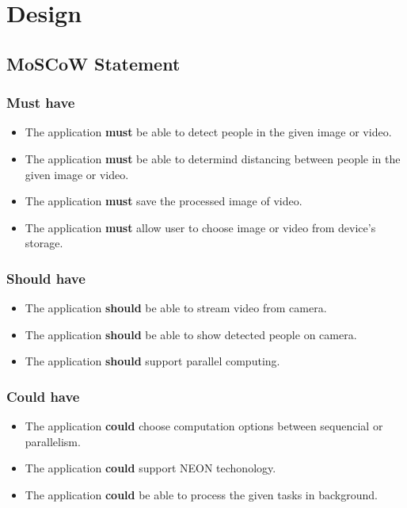 \chapter{Design}\label{design}

\section{MoSCoW Statement}


    \subsection{Must have}
        \begin{itemize}
            \setlength\itemsep{1em}
            \item The application \textbf{must} be able to detect people in the given image or video.
            \item The application \textbf{must} be able to determind distancing between people in the given image or video.
            \item The application \textbf{must} save the processed image of video.
            \item The application \textbf{must} allow user to choose image or video from device's storage.
        \end{itemize}

    \subsection{Should have}
        \begin{itemize}
            \item The application \textbf{should} be able to stream video from camera.
            \item The application \textbf{should} be able to show detected people on camera.
            \item The application \textbf{should} support parallel computing.
        \end{itemize}

    \subsection{Could have}
        \begin{itemize}
            \item The application \textbf{could} choose computation options between sequencial or parallelism.
            \item The application \textbf{could} support NEON techonology.
            \item The application \textbf{could} be able to process the given tasks in background.
        \end{itemize}
